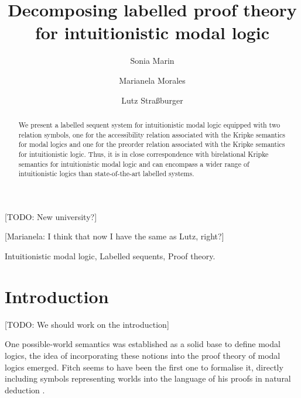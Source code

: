 \documentclass[twoside]{aiml18}
\newcommand{\marianela}[1]{{\color{purple}[Marianela: #1]}}
\newcommand{\todo}[1]{{\color{red}[TODO: #1]}}
\begin{document}
\begin{frontmatter}
  \title{Decomposing labelled proof theory for intuitionistic modal logic}
  \author{Sonia Marin}
  
  \todo{New university?}
  \address{IT-Universitetet i K{\o}benhavn \\ Denmark }
 \author{Marianela Morales}
 
 \marianela{I think that now I have the same as Lutz, right?}
 \address{Inria Saclay \& LIX, \'Ecole Polytechnique \\ France}
   \author{Lutz Stra{\ss}burger}
 \address{Inria Saclay \& LIX, \'Ecole Polytechnique \\ France}

 \begin{abstract}

   We present a labelled sequent system for intuitionistic modal logic equipped 
   with two relation symbols, one for the accessibility
   relation associated with the Kripke semantics for modal logics and
   one for the preorder relation associated with the Kripke semantics
   for intuitionistic logic. 
   Thus, it is in close correspondence with birelational Kripke semantics for intuitionistic modal logic and can encompass a wider range of intuitionistic logics than state-of-the-art labelled systems.


  \end{abstract}

  \begin{keyword}
  Intuitionistic modal logic, Labelled sequents, Proof theory.
  \end{keyword}
 \end{frontmatter}


\section{Introduction}
\todo{We should work on the introduction}

One possible-world semantics was established as a solid base to define modal logics, the idea of incorporating these notions into the proof theory of modal logics emerged. Fitch seems to have been the first one to formalise it, directly including symbols representing worlds into the language of his proofs in natural deduction \cite{Fitch}.
\end{document}
